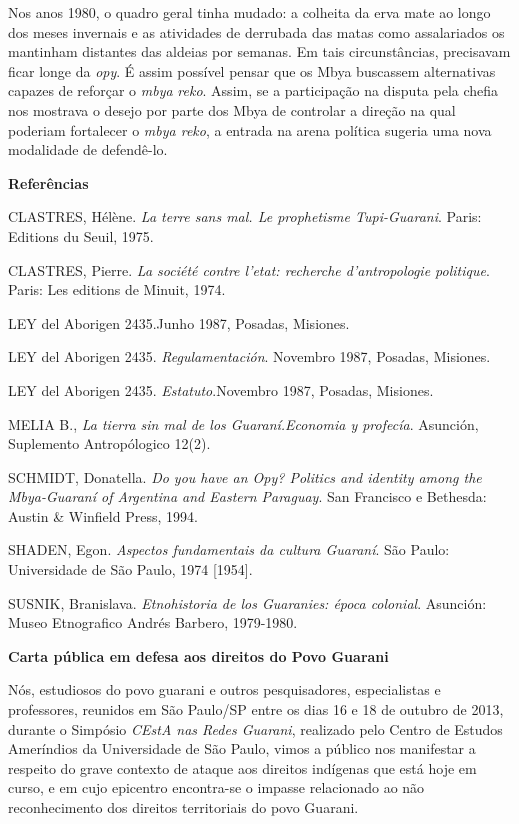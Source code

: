 Nos anos 1980, o quadro geral tinha mudado: a colheita da erva mate ao
longo dos meses invernais e as atividades de derrubada das matas como
assalariados os mantinham distantes das aldeias por semanas. Em tais
circunstâncias, precisavam ficar longe da \emph{opy}. É assim possível
pensar que os Mbya buscassem alternativas capazes de reforçar o
\emph{mbya} \emph{reko}. Assim, se a participação na disputa pela chefia
nos mostrava o desejo por parte dos Mbya de controlar a direção na qual
poderiam fortalecer o \emph{mbya reko}, a entrada na arena política
sugeria uma nova modalidade de defendê-lo.

\textbf{Referências}

CLASTRES, Hélène. \emph{La terre sans mal. Le prophetisme Tupi-Guarani}.
Paris: Editions du Seuil, 1975.

CLASTRES, Pierre. \emph{La société contre l'etat: recherche
d'antropologie politique}. Paris: Les editions de Minuit, 1974.

LEY del Aborigen 2435.Junho 1987, Posadas, Misiones.

LEY del Aborigen 2435. \emph{Regulamentación}. Novembro 1987, Posadas,
Misiones.

LEY del Aborigen 2435. \emph{Estatuto}.Novembro 1987, Posadas, Misiones.

MELIA B., \emph{La tierra sin mal de los Guaraní.Economia y profecía}.
Asunción, Suplemento Antropólogico 12(2).

SCHMIDT, Donatella. \emph{Do you have an Opy? Politics and identity
among the Mbya-Guaraní of Argentina and Eastern Paraguay}. San Francisco
e Bethesda: Austin \& Winfield Press, 1994.

SHADEN, Egon. \emph{Aspectos fundamentais da cultura Guaraní}. São
Paulo: Universidade de São Paulo, 1974 {[}1954{]}.

SUSNIK, Branislava. \emph{Etnohistoria de los Guaranies: época
colonial}. Asunción: Museo Etnografico Andrés Barbero, 1979-1980.

\textbf{Carta pública em defesa aos direitos do Povo Guarani}

Nós, estudiosos do povo guarani e outros pesquisadores, especialistas e
professores, reunidos em São Paulo/SP entre os dias 16 e 18 de outubro
de 2013, durante o Simpósio \emph{CEstA nas Redes Guarani}, realizado
pelo Centro de Estudos Ameríndios da Universidade de São Paulo, vimos a
público nos manifestar a respeito do grave contexto de ataque aos
direitos indígenas que está hoje em curso, e em cujo epicentro
encontra-se o impasse relacionado ao não reconhecimento dos direitos
territoriais do povo Guarani.

